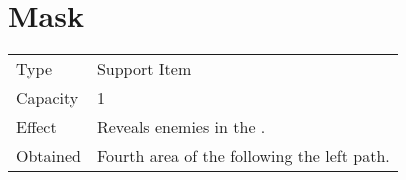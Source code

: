 \section{Mask}
\label{item:mask}


\noindent\begin{tabularx}{\textwidth}[l]{lX}
	Type
	& Support Item
\\
	Capacity
	& 1
\\
	Effect
	& Reveals enemies in the \nameref{map:volcano}.
\\
	Obtained
	& Fourth area of the \nameref{map:volcano} following the left path.
\end{tabularx}
